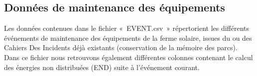 \begin{table}[htb]
\caption{La structure du fichier WEATHER\_STATION\_DATA\_SETS.csv }
\end{table}

\subsection{Données de maintenance des équipements}

Les données contenues dans le fichier « EVENT.csv » répertorient les différents événements de maintenance des équipements de la ferme solaire, issues du ou des Cahiers Des Incidents déjà existants (conservation de la mémoire des parcs). 
Dans ce fichier nous retrouvons également différentes colonnes contenant le calcul des énergies non distribuées (END) suite à l'événement courant.

